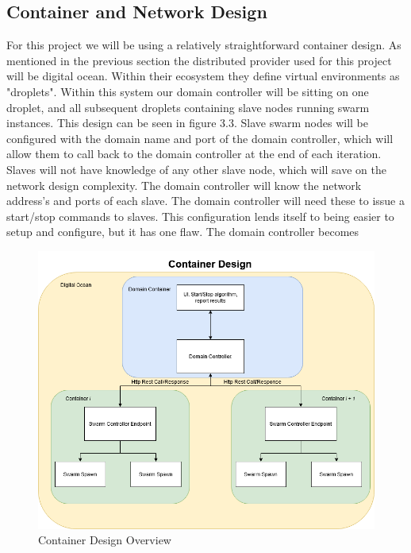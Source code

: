 \documentclass[oneside,12pt]{book}
\begin{document}
\subsection{Container and Network Design}
For this project we will be using a relatively straightforward container design. As mentioned in the previous section the distributed provider used for this project will be digital ocean. Within their ecosystem they define virtual environments as "droplets". Within this system our domain controller will be sitting on one droplet, and all subsequent droplets containing slave nodes running swarm instances. This design can be seen in figure 3.3. Slave swarm nodes will be configured with the domain name and port of the domain controller, which will allow them to call back to the domain controller at the end of each iteration. Slaves will not have knowledge of any other slave node, which will save on the network design complexity. The domain controller will know the network address's and ports of each slave. The domain controller will need these to issue a start/stop commands to slaves. 
This configuration lends itself to being easier to setup and configure, but it has one flaw. The domain controller becomes 
\begin{figure}[H]
    \centering
    \includegraphics[scale=0.25]{Images/ContainerDesign.png}
    \caption{Container Design Overview}
    \label{fig:Container Design Overview}
\end{figure}
\end{document}
